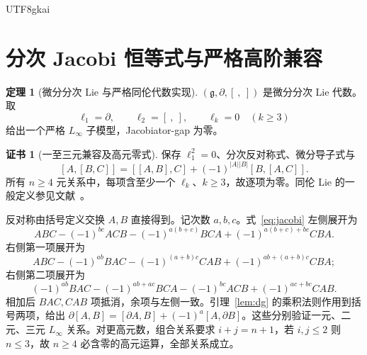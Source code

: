 \documentclass[12pt]{report}
\makeatletter
\theoremstyle{definition}
\newtheorem{theorem}{定理}[chapter]
\newtheorem{Certificate}{证书}[chapter]
\renewenvironment{proof}[1][\proofname]{\par
  \pushQED{\qed}\normalfont
  \topsep6\p@\@plus6\p@\relax
  \trivlist
  \item[\hskip\labelsep\normalfont #1\@addpunct{.}]\ignorespaces
}{
  \popQED\endtrivlist\@endpefalse
}
\makeatother
\begin{document}
\begin{CJK*}{UTF8}{gkai}
\section{分次 Jacobi 恒等式与严格高阶兼容}
\begin{theorem}[微分分次 Lie 与严格同伦代数实现]
\label{thm:linfty}
\((\mathfrak g,\partial,[\ ,\ ])\) 是微分分次 Lie 代数。取
\[
\ell_1=\partial,\qquad\ell_2=[\ ,\ ],\qquad\ell_k=0\quad(k\ge3)
\]
给出一个严格 \(L_\infty\) 子模型，Jacobiator-gap 为零。
\end{theorem}
\begin{Certificate}[一至三元兼容及高元零式]
保存 \(\ell_1^2=0\)、分次反对称式、微分导子式与
\begin{equation}\label{eq:jacobi}
[A,[B,C]]=[[A,B],C]+(-1)^{|A||B|}[B,[A,C]].
\end{equation}
所有 \(n\ge4\) 元关系中，每项含至少一个 \(\ell_k\)、\(k\ge3\)，故逐项为零。同伦 Lie 的一般定义参见文献~\cite{ladamarkl}。
\end{Certificate}
\begin{proof}
反对称由括号定义交换 \(A,B\) 直接得到。记次数 \(a,b,c\)。式~\eqref{eq:jacobi} 左侧展开为
\[
ABC-(-1)^{bc}ACB-(-1)^{a(b+c)}BCA
+(-1)^{a(b+c)+bc}CBA.
\]
右侧第一项展开为
\[
ABC-(-1)^{ab}BAC-(-1)^{(a+b)c}CAB
+(-1)^{ab+(a+b)c}CBA;
\]
右侧第二项展开为
\[
(-1)^{ab}BAC-(-1)^{ab+ac}BCA
-(-1)^{bc}ACB+(-1)^{ac+bc}CAB.
\]
相加后 \(BAC,CAB\) 项抵消，余项与左侧一致。引理~\ref{lem:dg} 的乘积法则作用到括号两项，给出
\(\partial[A,B]=[\partial A,B]+(-1)^a[A,\partial B]\)。这些分别验证一元、二元、三元 \(L_\infty\) 关系。对更高元数，组合关系要求 \(i+j=n+1\)，若 \(i,j\le2\) 则 \(n\le3\)，故 \(n\ge4\) 必含零的高元运算，全部关系成立。
\end{proof}


\end{CJK*}
\end{document}
